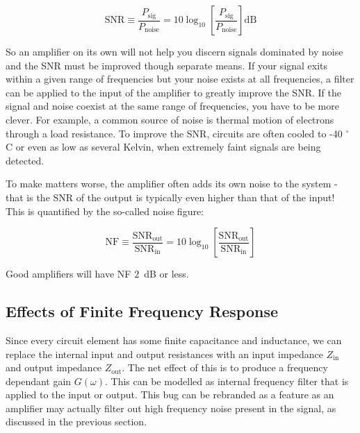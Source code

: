 \documentclass{tufte-book}
\begin{document}
\begin{equation}
\label{eq:def_snr}
\text{SNR} \equiv \frac{P_\text{sig}}{P_\text{noise}} = 10\log_{10}\left[\frac{P_\text{sig}}{P_\text{noise}}\right] \text{dB}
\end{equation}

So an amplifier on its own will not help you discern signals dominated by noise and the SNR must be improved though separate means. If your signal exits within a given range of frequencies but your noise exists at all frequencies, a filter can be applied to the input of the amplifier to greatly improve the SNR. If the  signal and noise coexist at the same range of frequencies, you have to be more clever. For example, a common source of noise is thermal motion of electrons through a load resistance. To improve the SNR, circuits are often cooled to -40 $^\circ$C or even as low as several Kelvin, when extremely faint signals are being detected.

To make matters worse, the amplifier often adds its own noise to the system - that is the SNR of the output is typically even higher than that of the input! This is quantified by the so-called noise figure:

\begin{equation}
\label{eq:def_noise_figure}
\text{NF} \equiv \frac{\text{SNR}_\text{out}}{\text{SNR}_\text{in}} = 10\log_{10}\left[\frac{\text{SNR}_\text{out}}{\text{SNR}_\text{in}}\right]
\end{equation}

\noindent Good amplifiers will have NF $2$~dB or less.

\subsection{Effects of Finite Frequency Response}
Since every circuit element has some finite capacitance and inductance, we can replace the internal input and output resistances with an input impedance $Z_\text{in}$ and output impedance $Z_\text{out}$. The net effect of this is to produce a frequency dependant gain $G(\omega)$. This can be modelled as internal frequency filter that is applied to the input or output. This bug can be rebranded as a feature as an amplifier may actually filter out high frequency noise present in the signal, as discussed in the previous section.
\end{document}
